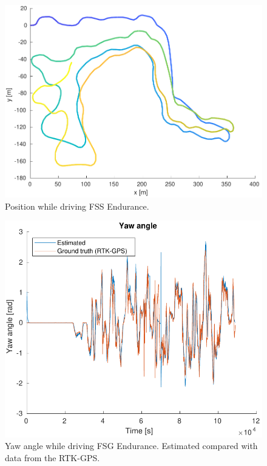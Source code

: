 \begin{figure}
    \centering
    \includegraphics[width=0.8\linewidth]{0_Images/6_Results/positionFSSEndurance.pdf}
    \caption[Position while driving FSS Endurance.]
    {Position while driving FSS Endurance.}
    \label{Fig:PosFSSEndurance}
\end{figure}

\begin{figure}
    \centering
    \includegraphics[width=0.8\linewidth]{0_Images/6_Results/yawFSGEndurance.pdf}
    \caption[Yaw angle while driving FSG Endurance.]
    {Yaw angle while driving FSG Endurance. Estimated compared with data from the RTK-GPS.}
    \label{Fig:YawFSGEndurance}
\end{figure}

